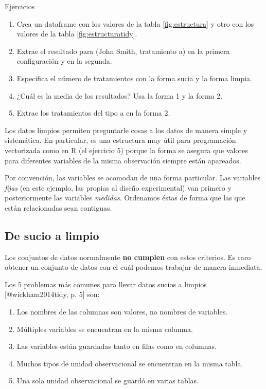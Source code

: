 \documentclass[]{article}
\providecommand{\tightlist}{%
  \setlength{\itemsep}{0pt}\setlength{\parskip}{0pt}}
\begin{document}
\begin{bclogo}[
  couleur=llred,
  arrondi=0,
  logo=\bcstop,
  barre=none,
  noborder=true]{Ejercicios}
\begin{enumerate}
\item Crea un dataframe con los valores de la tabla \ref{fig:estructura} y otro 
con los valores de la tabla \ref{fig:estructuratidy}.
\item Extrae el resultado para (John Smith, tratamiento a) en la primera configuración y en la segunda.
\item Especifica el número de tratamientos con la forma sucia y la forma limpia.
\item ¿Cuál es la media de los resultados? Usa la forma 1 y la forma 2.
\item Extrae los tratamientos del tipo a en la forma 2.
\end{enumerate}

\end{bclogo}

Los datos limpios permiten preguntarle cosas a los datos de manera
simple y sistemática. En particular, es una estructura muy útil para
programación vectorizada como en R (el ejercicio 5) porque la forma se
asegura que valores para diferentes variables de la misma observación
siempre están apareados.

Por convención, las variables se acomodan de una forma particular. Las
variables \emph{fijas} (en este ejemplo, las propias al diseño
experimental) van primero y posteriormente las variables \emph{medidas}.
Ordenamos éstas de forma que las que están relacionadas sean contiguas.

\subsection{De sucio a limpio}\label{de-sucio-a-limpio}

Los conjuntos de datos normalmente \textbf{no cumplen} con estos
criterios. Es raro obtener un conjunto de datos con el cuál podemos
trabajar de manera inmediata.

Los 5 problemas más comunes para llevar datos sucios a limpios
{[}@wickham2014tidy, p. 5{]} son:

\begin{enumerate}
\def\labelenumi{\arabic{enumi}.}
\tightlist
\item
  Los nombres de las columnas son valores, no nombres de variables.
\item
  Múltiples variables se encuentran en la misma columna.
\item
  Las variables están guardadas tanto en filas como en columnas.
\item
  Muchos tipos de unidad observacional se encuentran en la misma tabla.
\item
  Una sola unidad observacional se guardó en varias tablas.
\end{enumerate}
\end{document}

